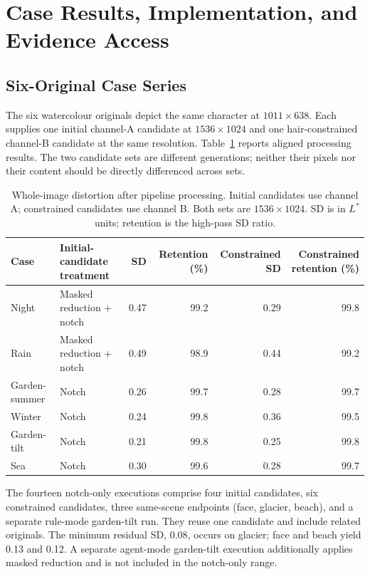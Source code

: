 \documentclass[sigplan,10pt,nonacm]{acmart}
\begin{document}
\section{Case Results, Implementation, and Evidence Access}
\label{app:pipeline}
\subsection{Six-Original Case Series}
The six watercolour originals depict the same character at $1011\times638$. Each supplies one initial channel-A candidate at $1536\times1024$ and one hair-constrained channel-B candidate at the same resolution. Table~\ref{tab:cases} reports aligned processing results. The two candidate sets are different generations; neither their pixels nor their content should be directly differenced across sets.

\begin{table}[h!]
\caption{Whole-image distortion after pipeline processing. Initial candidates use channel A; constrained candidates use channel B. Both sets are $1536\times1024$. SD is in $L^*$ units; retention is the high-pass SD ratio.}
\label{tab:cases}
\centering\small
\begin{tabular}{llrrrr}
\toprule
Case & Initial-candidate treatment & SD & Retention (\%) & Constrained SD & Constrained retention (\%) \\
\midrule
Night & Masked reduction + notch & 0.47 & 99.2 & 0.29 & 99.8 \\
Rain & Masked reduction + notch & 0.49 & 98.9 & 0.44 & 99.2 \\
Garden-summer & Notch & 0.26 & 99.7 & 0.28 & 99.7 \\
Winter & Notch & 0.24 & 99.8 & 0.36 & 99.5 \\
Garden-tilt & Notch & 0.21 & 99.8 & 0.25 & 99.8 \\
Sea & Notch & 0.30 & 99.6 & 0.28 & 99.7 \\
\bottomrule
\end{tabular}
\end{table}

The fourteen notch-only executions comprise four initial candidates, six constrained candidates, three same-scene endpoints (face, glacier, beach), and a separate rule-mode garden-tilt run. They reuse one candidate and include related originals. The minimum residual SD, 0.08, occurs on glacier; face and beach yield 0.13 and 0.12. A separate agent-mode garden-tilt execution additionally applies masked reduction and is not included in the notch-only range.
\end{document}
